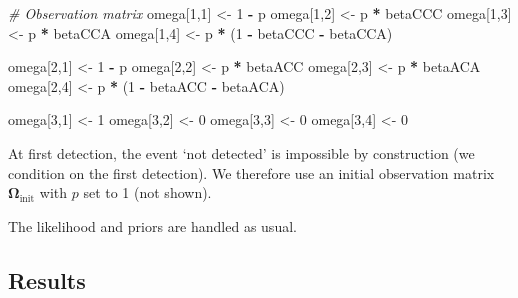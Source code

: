 \documentclass[
  12pt,
]{krantz}
\newenvironment{Shaded}{\begin{snugshade}}{\end{snugshade}}
\newcommand{\CommentTok}[1]{\textcolor[rgb]{0.56,0.35,0.01}{\textit{#1}}}
\newcommand{\DecValTok}[1]{\textcolor[rgb]{0.00,0.00,0.81}{#1}}
\newcommand{\NormalTok}[1]{#1}
\newcommand{\OtherTok}[1]{\textcolor[rgb]{0.56,0.35,0.01}{#1}}
\newcommand{\SpecialCharTok}[1]{\textcolor[rgb]{0.81,0.36,0.00}{\textbf{#1}}}
\begin{document}
\begin{Shaded}
\begin{Highlighting}[]
\CommentTok{\# Observation matrix}
\NormalTok{omega[}\DecValTok{1}\NormalTok{,}\DecValTok{1}\NormalTok{] }\OtherTok{\textless{}{-}} \DecValTok{1} \SpecialCharTok{{-}}\NormalTok{ p}
\NormalTok{omega[}\DecValTok{1}\NormalTok{,}\DecValTok{2}\NormalTok{] }\OtherTok{\textless{}{-}}\NormalTok{ p }\SpecialCharTok{*}\NormalTok{ betaCCC}
\NormalTok{omega[}\DecValTok{1}\NormalTok{,}\DecValTok{3}\NormalTok{] }\OtherTok{\textless{}{-}}\NormalTok{ p }\SpecialCharTok{*}\NormalTok{ betaCCA}
\NormalTok{omega[}\DecValTok{1}\NormalTok{,}\DecValTok{4}\NormalTok{] }\OtherTok{\textless{}{-}}\NormalTok{ p }\SpecialCharTok{*}\NormalTok{ (}\DecValTok{1} \SpecialCharTok{{-}}\NormalTok{ betaCCC }\SpecialCharTok{{-}}\NormalTok{ betaCCA)}

\NormalTok{omega[}\DecValTok{2}\NormalTok{,}\DecValTok{1}\NormalTok{] }\OtherTok{\textless{}{-}} \DecValTok{1} \SpecialCharTok{{-}}\NormalTok{ p}
\NormalTok{omega[}\DecValTok{2}\NormalTok{,}\DecValTok{2}\NormalTok{] }\OtherTok{\textless{}{-}}\NormalTok{ p }\SpecialCharTok{*}\NormalTok{ betaACC}
\NormalTok{omega[}\DecValTok{2}\NormalTok{,}\DecValTok{3}\NormalTok{] }\OtherTok{\textless{}{-}}\NormalTok{ p }\SpecialCharTok{*}\NormalTok{ betaACA}
\NormalTok{omega[}\DecValTok{2}\NormalTok{,}\DecValTok{4}\NormalTok{] }\OtherTok{\textless{}{-}}\NormalTok{ p }\SpecialCharTok{*}\NormalTok{ (}\DecValTok{1} \SpecialCharTok{{-}}\NormalTok{ betaACC }\SpecialCharTok{{-}}\NormalTok{ betaACA)}

\NormalTok{omega[}\DecValTok{3}\NormalTok{,}\DecValTok{1}\NormalTok{] }\OtherTok{\textless{}{-}} \DecValTok{1}
\NormalTok{omega[}\DecValTok{3}\NormalTok{,}\DecValTok{2}\NormalTok{] }\OtherTok{\textless{}{-}} \DecValTok{0}
\NormalTok{omega[}\DecValTok{3}\NormalTok{,}\DecValTok{3}\NormalTok{] }\OtherTok{\textless{}{-}} \DecValTok{0}
\NormalTok{omega[}\DecValTok{3}\NormalTok{,}\DecValTok{4}\NormalTok{] }\OtherTok{\textless{}{-}} \DecValTok{0}
\end{Highlighting}
\end{Shaded}

At first detection, the event `not detected' is impossible by construction (we condition on the first detection). We therefore use an initial observation matrix \(\mathbf{\Omega}_{\text{init}}\) with \(p\) set to 1 (not shown).

The likelihood and priors are handled as usual.

\subsection{Results}\label{results-1}
\end{document}
